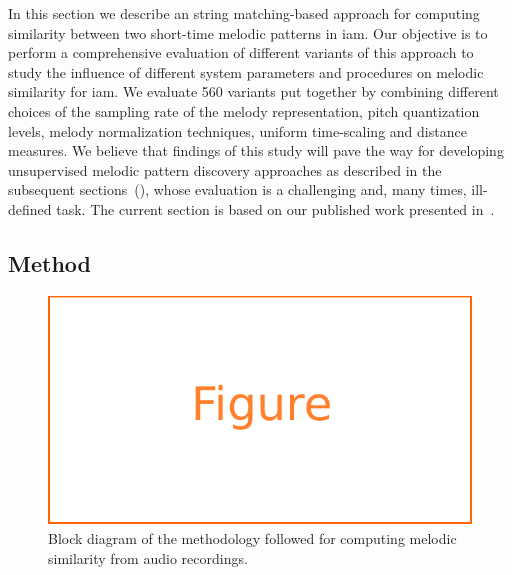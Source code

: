 

In this section we describe an string matching-based approach for computing similarity between two short-time melodic patterns in \gls{iam}. Our objective is to perform a comprehensive evaluation of different variants of this approach to study the influence of different system parameters and procedures on melodic similarity for \gls{iam}. We evaluate 560 variants put together by combining different choices of the sampling rate of the melody representation, pitch quantization levels, melody normalization techniques, uniform time-scaling and distance measures. We believe that findings of this study will pave the way for developing unsupervised melodic pattern discovery approaches as described in the subsequent sections~(), whose evaluation is a challenging and, many times, ill-defined task. The current section is based on our published work presented in~\cite{gulati_ICASSP2015}.

\subsection{Method}
\label{sec:method_similarity_evaluation}


\begin{figure}
	\begin{center}
		\includegraphics[width=\figSizeEighty]{ch06_patterns/figures/figure_todo.pdf}
	\end{center}
	\caption{Block diagram of the methodology followed for computing melodic similarity from audio recordings.}
	\label{fig:block_diagram_melodic_similarity}
\end{figure}

